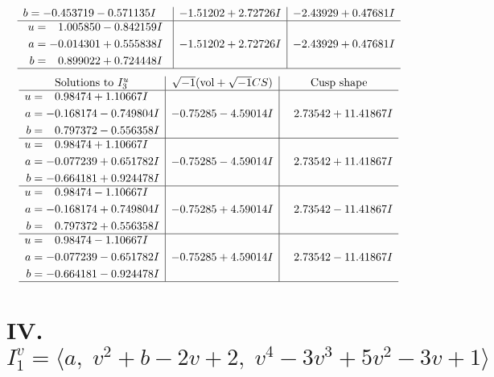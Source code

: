\documentclass[1p]{elsarticle_modified}
\theoremstyle{definition}
\newcommand{\I}{\sqrt{-1}}
\begin{document}
$$\begin{array}{c|c|c}
\begin{aligned}
b &= -0.453719 - 0.571135 I\end{aligned}
 & -1.51202 + 2.72726 I & -2.43929 + 0.47681 I \\ \hline\begin{aligned}
u &= \phantom{-}1.005850 - 0.842159 I \\
a &= -0.014301 + 0.555838 I \\
b &= \phantom{-}0.899022 + 0.724448 I\end{aligned}
 & -1.51202 + 2.72726 I & -2.43929 + 0.47681 I\\
 \hline 
 \end{array}$$\newpage$$\begin{array}{c|c|c}  
\text{Solutions to }I^u_{3}& \I (\text{vol} + \sqrt{-1}CS) & \text{Cusp shape}\\
 \hline 
\begin{aligned}
u &= \phantom{-}0.98474 + 1.10667 I \\
a &= -0.168174 - 0.749804 I \\
b &= \phantom{-}0.797372 - 0.556358 I\end{aligned}
 & -0.75285 - 4.59014 I & \phantom{-}2.73542 + 11.41867 I \\ \hline\begin{aligned}
u &= \phantom{-}0.98474 + 1.10667 I \\
a &= -0.077239 + 0.651782 I \\
b &= -0.664181 + 0.924478 I\end{aligned}
 & -0.75285 - 4.59014 I & \phantom{-}2.73542 + 11.41867 I \\ \hline\begin{aligned}
u &= \phantom{-}0.98474 - 1.10667 I \\
a &= -0.168174 + 0.749804 I \\
b &= \phantom{-}0.797372 + 0.556358 I\end{aligned}
 & -0.75285 + 4.59014 I & \phantom{-}2.73542 - 11.41867 I \\ \hline\begin{aligned}
u &= \phantom{-}0.98474 - 1.10667 I \\
a &= -0.077239 - 0.651782 I \\
b &= -0.664181 - 0.924478 I\end{aligned}
 & -0.75285 + 4.59014 I & \phantom{-}2.73542 - 11.41867 I\\
 \hline 
 \end{array}$$\newpage\newpage\renewcommand{\arraystretch}{1}
\centering \section*{IV. $I^v_{1}= \langle a,\;v^2+b-2 v+2,\;v^4-3 v^3+5 v^2-3 v+1 \rangle$}
\end{document}
